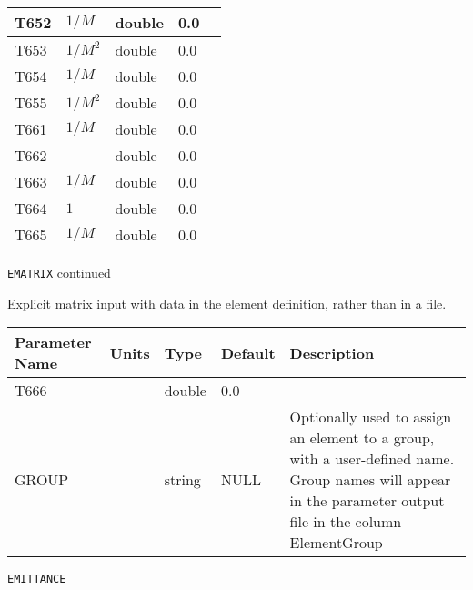 \begin{tabular}{|l|l|l|l|p{\descwidth}|}
T652 & $1/M$ & double &  0.0 & \\ \hline 
T653 & $1/M^2$ & double &  0.0 & \\ \hline 
T654 & $1/M$ & double &  0.0 & \\ \hline 
T655 & $1/M^2$ & double &  0.0 & \\ \hline 
T661 & $1/M$ & double &  0.0 & \\ \hline 
T662 &  & double &  0.0 & \\ \hline 
T663 & $1/M$ & double &  0.0 & \\ \hline 
T664 & $1$ & double &  0.0 & \\ \hline 
T665 & $1/M$ & double &  0.0 & \\ \hline 
\end{tabular}

\newpage
\begin{center}{\Large\verb|EMATRIX| continued}\end{center}
Explicit matrix input with data in the element definition, rather than in a file.
\\
\begin{tabular}{|l|l|l|l|p{\descwidth}|} \hline
Parameter Name & Units & Type & Default & Description \\ \hline 
T666 &  & double &  0.0 & \\ \hline 
GROUP &  & string & NULL & Optionally used to assign an element to a group, with a user-defined name.  Group names will appear in the parameter output file in the column ElementGroup  \\ \hline 
\end{tabular}

\vspace*{0.5in}

\newpage
\begin{center}{\Large\verb|EMITTANCE|}\end{center}
